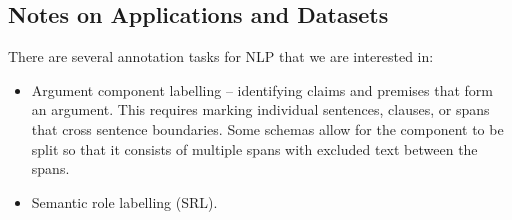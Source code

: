 \subsection{Notes on Applications and Datasets}

There are several annotation tasks for NLP that we are interested in:
\begin{itemize}
  \item Argument component labelling -- identifying claims and premises that form an argument. This requires marking individual sentences, clauses, or spans that cross sentence boundaries. Some schemas allow for the component to be split so that it consists of multiple spans with excluded text between the spans.
  \item Semantic role labelling (SRL).
\end{itemize}

